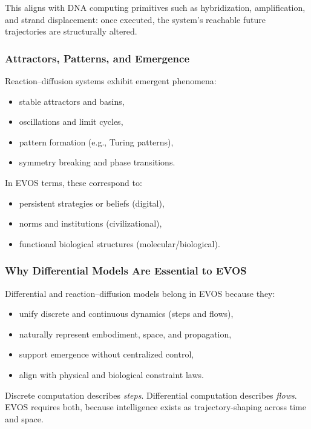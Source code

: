 \documentclass[11pt]{article}
\begin{document}
This aligns with DNA computing primitives such as hybridization, amplification, and
strand displacement: once executed, the system's reachable future trajectories are
structurally altered.

\subsubsection{Attractors, Patterns, and Emergence}

Reaction--diffusion systems exhibit emergent phenomena:
\begin{itemize}
  \item stable attractors and basins,
  \item oscillations and limit cycles,
  \item pattern formation (e.g., Turing patterns),
  \item symmetry breaking and phase transitions.
\end{itemize}

In EVOS terms, these correspond to:
\begin{itemize}
  \item persistent strategies or beliefs (digital),
  \item norms and institutions (civilizational),
  \item functional biological structures (molecular/biological).
\end{itemize}

\subsubsection{Why Differential Models Are Essential to EVOS}

Differential and reaction--diffusion models belong in EVOS because they:
\begin{itemize}
  \item unify discrete and continuous dynamics (steps and flows),
  \item naturally represent embodiment, space, and propagation,
  \item support emergence without centralized control,
  \item align with physical and biological constraint laws.
\end{itemize}

Discrete computation describes \emph{steps}. Differential computation describes \emph{flows}.
EVOS requires both, because intelligence exists as trajectory-shaping across time and space.
\end{document}
